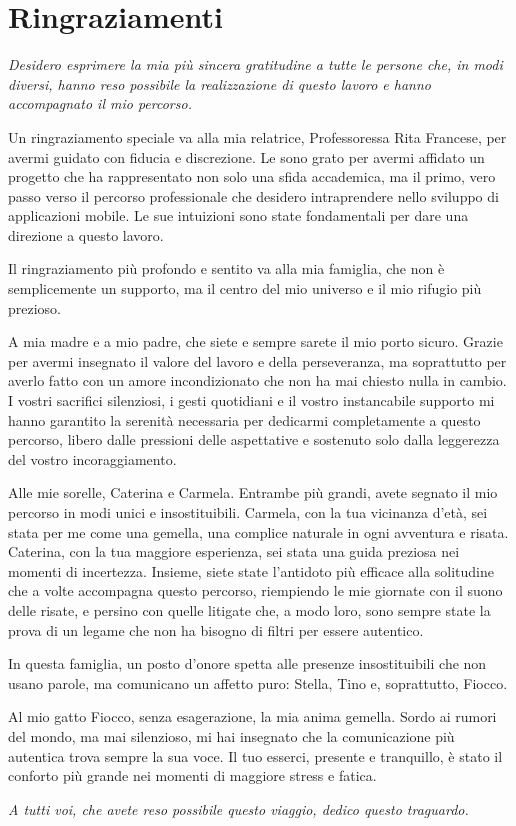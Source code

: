 \chapter*{Ringraziamenti}
\fancyhf{}

\textit{Desidero esprimere la mia più sincera gratitudine a tutte le persone che, in modi diversi, hanno reso possibile la realizzazione di questo lavoro e hanno accompagnato il mio percorso.}
\addvspace{1.5em}

Un ringraziamento speciale va alla mia relatrice, Professoressa Rita Francese, per avermi guidato con fiducia e discrezione.
Le sono grato per avermi affidato un progetto che ha rappresentato non solo una sfida accademica, ma il primo, vero passo verso il percorso professionale che desidero intraprendere nello sviluppo di applicazioni mobile.
Le sue intuizioni sono state fondamentali per dare una direzione a questo lavoro.
\addvspace{1em}

Il ringraziamento più profondo e sentito va alla mia famiglia, che non è semplicemente un supporto, ma il centro del mio universo e il mio rifugio più prezioso.
\addvspace{1em}

A mia madre e a mio padre, che siete e sempre sarete il mio porto sicuro.
Grazie per avermi insegnato il valore del lavoro e della perseveranza, ma soprattutto per averlo fatto con un amore incondizionato che non ha mai chiesto nulla in cambio.
I vostri sacrifici silenziosi, i gesti quotidiani e il vostro instancabile supporto mi hanno garantito la serenità necessaria per dedicarmi completamente a questo percorso, libero dalle pressioni delle aspettative e sostenuto solo dalla leggerezza del vostro incoraggiamento.
\addvspace{1em}

Alle mie sorelle, Caterina e Carmela.
Entrambe più grandi, avete segnato il mio percorso in modi unici e insostituibili.
Carmela, con la tua vicinanza d'età, sei stata per me come una gemella, una complice naturale in ogni avventura e risata.
Caterina, con la tua maggiore esperienza, sei stata una guida preziosa nei momenti di incertezza.
Insieme, siete state l'antidoto più efficace alla solitudine che a volte accompagna questo percorso, riempiendo le mie giornate con il suono delle risate, e persino con quelle litigate che, a modo loro, sono sempre state la prova di un legame che non ha bisogno di filtri per essere autentico.
\addvspace{1em}

In questa famiglia, un posto d'onore spetta alle presenze insostituibili che non usano parole, ma comunicano un affetto puro: Stella, Tino e, soprattutto, Fiocco.
\addvspace{1em}

Al mio gatto Fiocco, senza esagerazione, la mia anima gemella.
Sordo ai rumori del mondo, ma mai silenzioso, mi hai insegnato che la comunicazione più autentica trova sempre la sua voce.
Il tuo esserci, presente e tranquillo, è stato il conforto più grande nei momenti di maggiore stress e fatica.
\addvspace{1.5em}

\textit{A tutti voi, che avete reso possibile questo viaggio, dedico questo traguardo.}